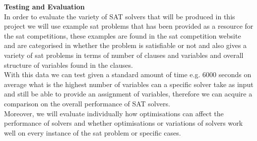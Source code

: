 \documentclass[12pt,a4paper]{article}
\begin{document}
{\bf Testing and Evaluation}\\
In order to evaluate the variety of SAT solvers that will be produced in this project we will use example sat problems that has been provided as a resource for the sat competitions, these examples are found in the sat competition website \cite{satComp} and are categorised in whether the problem is satisfiable or not and also gives a variety of sat problems in terms of number of clauses and variables and overall structure of variables found in the clauses.\\
With this data we can test given a standard amount of time e.g. 6000 seconds on average what is the highest number of variables can a specific solver take as input and still be able to provide an assignment of variables, therefore we can acquire a comparison on the overall performance of SAT solvers. \\
Moreover, we will evaluate individually how optimisations can affect the performance of solvers and whether optimisations or variations of solvers work well on every instance of the sat problem or specific cases.






\end{document}
